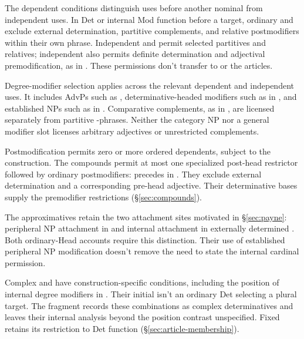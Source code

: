 \documentclass[12pt]{article}
\begin{document}
The dependent conditions distinguish uses before another nominal from independent uses. In Det or internal Mod function before a target, ordinary  and  exclude external determination, partitive complements, and relative postmodifiers within their own phrase. Independent  and  permit selected partitives and relatives; independent  also permits definite determination and adjectival premodification, as in . These permissions don't transfer to  or the articles.

Degree-modifier selection applies across the relevant dependent and independent uses. It includes AdvPs such as , determinative-headed modifiers such as  in , and established NPs such as  in . Comparative complements, as in , are licensed separately from partitive -phrases. Neither the category NP nor a general modifier slot licenses arbitrary adjectives or unrestricted complements.

Postmodification permits zero or more ordered dependents, subject to the construction. The compounds permit at most one specialized post-head restrictor followed by ordinary postmodifiers:  precedes  in . They exclude external determination and a corresponding pre-head adjective. Their determinative bases supply the premodifier restrictions (§\ref{sec:compounds}).

The approximatives retain the two attachment sites motivated in §\ref{sec:payne}: peripheral NP attachment in  and internal attachment in externally determined . Both ordinary-Head accounts require this distinction. Their use of established peripheral NP modification doesn't remove the need to state the internal cardinal permission.

Complex  and  have construction-specific conditions, including the position of internal degree modifiers in . Their initial  isn't an ordinary Det selecting a plural  target. The fragment records these combinations as complex determinatives and leaves their internal analysis beyond the position contrast unspecified. Fixed  retains its restriction to Det function (§\ref{sec:article-membership}).
\end{document}

